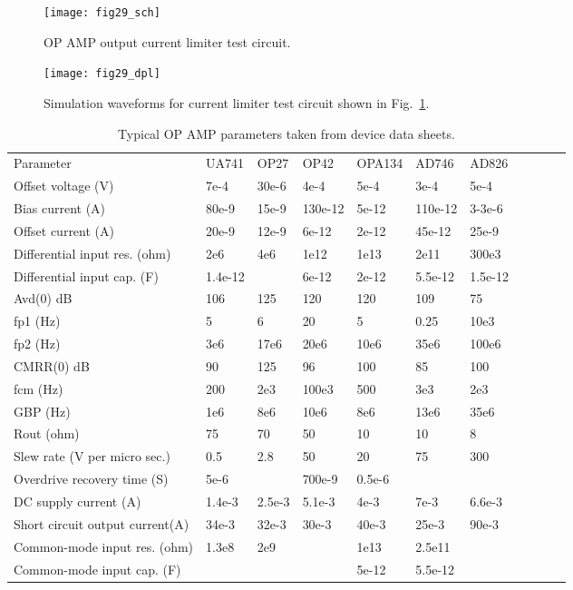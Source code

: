 \begin{figure}
  \centering
  \texttt{[image: fig29\_sch]}
  \caption{OP AMP output current limiter test circuit.} 
  \label{fig:opamp29}
\end{figure}

\begin{figure}
  \centering
  \texttt{[image: fig29\_dpl]}
  \caption{Simulation waveforms for current limiter test circuit shown in Fig.~\ref{fig:opamp29}.} 
  \label{fig:opamp30}
\end{figure}


\begin{table}
\centering
\begin{tabular}{lllllllllll}
Parameter & UA741 & OP27 & OP42 & OPA134 & AD746 & AD826 &  \\ 
Offset voltage (V) & 7e-4 & 30e-6 & 4e-4 & 5e-4 & 3e-4 & 5e-4 &  \\ 
Bias current (A) & 80e-9 & 15e-9 & 130e-12 & 5e-12 & 110e-12 & 3-3e-6 & \\ 
Offset current (A) & 20e-9 & 12e-9 & 6e-12 & 2e-12 & 45e-12 & 25e-9 &  \\ 
Differential input res. (ohm) & 2e6 & 4e6 & 1e12 & 1e13 & 2e11 & 300e3 &  \\ 
Differential input cap. (F) & 1.4e-12 &  & 6e-12 & 2e-12 & 5.5e-12 & 1.5e-12 & \\ 
Avd(0) dB & 106 & 125 & 120 & 120 & 109 & 75 &  \\ 
fp1 (Hz) & 5 & 6 & 20 & 5 & 0.25 & 10e3 &  \\ 
fp2 (Hz) & 3e6 & 17e6 & 20e6 & 10e6 & 35e6 & 100e6 & \\ 
CMRR(0) dB & 90 & 125 & 96 & 100 & 85 & 100 &  \\ 
fcm (Hz) & 200 & 2e3 & 100e3 & 500 & 3e3 & 2e3 &  \\ 
GBP (Hz) & 1e6 & 8e6 & 10e6 & 8e6 & 13e6 & 35e6 & \\ 
Rout (ohm) & 75 & 70 & 50 & 10 & 10 & 8 &  \\ 
Slew rate (V per micro sec.) & 0.5 & 2.8 & 50 & 20 & 75 & 300 &  \\ 
Overdrive recovery time (S) & 5e-6 &   & 700e-9 & 0.5e-6 &   &   & \\ 
DC supply current (A) & 1.4e-3 & 2.5e-3 & 5.1e-3 & 4e-3 & 7e-3 & 6.6e-3 & \\ 
Short circuit output current(A) & 34e-3 & 32e-3 & 30e-3 & 40e-3 & 25e-3 & 90e-3 &  \\ 
Common-mode input res. (ohm) & 1.3e8  & 2e9 &   & 1e13 & 2.5e11 &   &  \\ 
Common-mode input cap. (F) &   &   &   & 5e-12 & 5.5e-12 &   & 
\end{tabular}
\caption{Typical OP AMP parameters taken from device data sheets.}
\label{tab:tab1}
\end{table}

